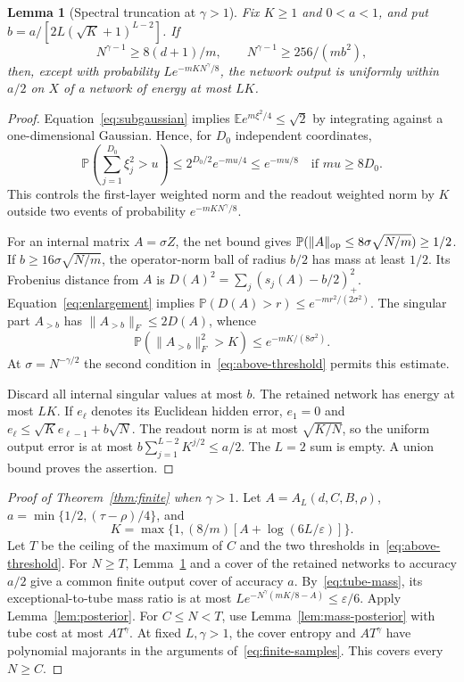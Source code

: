 \documentclass[11pt]{article}
\newtheorem{lemma}[theorem]{Lemma}\newtheorem{corollary}[theorem]{Corollary}
\theoremstyle{remark}\newtheorem{remark}[theorem]{Remark}
\newcommand{\E}{\mathbb E}\newcommand{\Prb}{\mathbb P}\newcommand{\R}{\mathbb R}
\begin{document}
\begin{lemma}[Spectral truncation at $\gamma>1$]\label{lem:spectral}
Fix $K\geq1$ and $0<a<1$, and put
$b=a/[2L(\sqrt K+1)^{L-2}]$. If
\begin{equation}\label{eq:above-threshold}
 N^{\gamma-1}\geq8(d+1)/m,\qquad
 N^{\gamma-1}\geq256/(mb^2),
\end{equation}
then, except with probability $Le^{-mKN^\gamma/8}$, the network output
is uniformly within $a/2$ on $X$ of a network of energy at most $LK$.
\end{lemma}
\begin{proof}
Equation~\eqref{eq:subgaussian} implies
$\E e^{m\xi^2/4}\leq\sqrt2$ by integrating against a one-dimensional
Gaussian. Hence, for $D_0$ independent coordinates,
\begin{equation}\label{eq:squares}
 \Prb\left(\sum_{j=1}^{D_0}\xi_j^2>u\right)
 \leq2^{D_0/2}e^{-mu/4}\leq e^{-mu/8}
 \quad\text{if }mu\geq8D_0.
\end{equation}
This controls the first-layer weighted norm and the readout weighted norm
by $K$ outside two events of probability $e^{-mKN^\gamma/8}$.

For an internal matrix $A=\sigma Z$, the net bound gives
$\Prb(\|A\|_{\rm op}\leq8\sigma\sqrt{N/m})\geq1/2$.
If $b\geq16\sigma\sqrt{N/m}$, the operator-norm ball of radius $b/2$
has mass at least $1/2$. Its Frobenius distance from $A$ is
$D(A)^2=\sum_j(s_j(A)-b/2)_+^2$. Equation~\eqref{eq:enlargement}
implies $\Prb(D(A)>r)\leq e^{-mr^2/(2\sigma^2)}$.
The singular part $A_{>b}$ has $\|A_{>b}\|_F\leq2D(A)$, whence
\[
 \Prb(\|A_{>b}\|_F^2>K)\leq e^{-mK/(8\sigma^2)}.
\]
At $\sigma=N^{-\gamma/2}$ the second condition
in~\eqref{eq:above-threshold} permits this estimate.

Discard all internal singular values at most $b$. The retained network
has energy at most $LK$. If $e_\ell$ denotes its Euclidean hidden error,
$e_1=0$ and $e_\ell\leq\sqrt K e_{\ell-1}+b\sqrt N$.
The readout norm is at most $\sqrt{K/N}$, so the uniform output error
is at most $b\sum_{j=1}^{L-2}K^{j/2}\leq a/2$.
The $L=2$ sum is empty. A union bound proves the assertion.
\end{proof}

\begin{proof}[Proof of Theorem~\ref{thm:finite} when $\gamma>1$]
Let $A=A_L(d,C,B,\rho)$, $a=\min\{1/2,(\tau-\rho)/4\}$, and
\[
 K=\max\{1,(8/m)[A+\log(6L/\varepsilon)]\}.
\]
Let $T$ be the ceiling of the maximum of $C$ and the two thresholds
in~\eqref{eq:above-threshold}. For $N\geq T$,
Lemma~\ref{lem:spectral} and a cover of the retained networks to accuracy
$a/2$ give a common finite output cover of accuracy $a$.
By~\eqref{eq:tube-mass}, its exceptional-to-tube mass ratio is at most
$Le^{-N^\gamma(mK/8-A)}\leq\varepsilon/6$.
Apply Lemma~\ref{lem:posterior}.
For $C\leq N<T$, use Lemma~\ref{lem:mass-posterior} with tube cost
at most $AT^\gamma$. At fixed $L,\gamma>1$, the cover entropy and
$AT^\gamma$ have polynomial majorants in the arguments
of~\eqref{eq:finite-samples}. This covers every $N\geq C$.
\end{proof}
\end{document}
